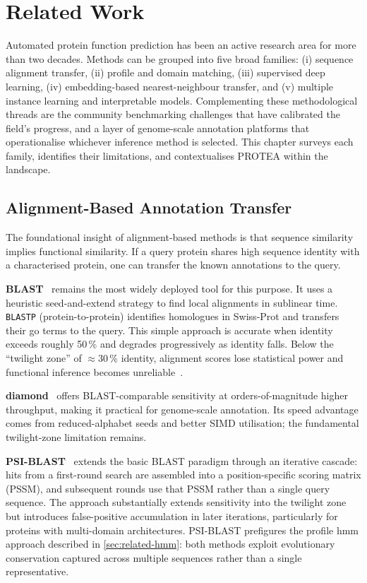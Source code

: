 \chapter{Related Work}
\label{chap:related}

Automated protein function prediction has been an active research area for more
than two decades. Methods can be grouped into five broad families: (i) sequence
alignment transfer, (ii) profile and domain matching, (iii) supervised deep
learning, (iv) embedding-based nearest-neighbour transfer, and (v) multiple
instance learning and interpretable models. Complementing these methodological
threads are the community benchmarking challenges that have calibrated the
field's progress, and a layer of genome-scale annotation platforms that
operationalise whichever inference method is selected. This chapter surveys each
family, identifies their limitations, and contextualises PROTEA within the
landscape.

\section{Alignment-Based Annotation Transfer}
\label{sec:related-alignment}

The foundational insight of alignment-based methods is that sequence similarity
implies functional similarity. If a query protein shares high sequence identity
with a characterised protein, one can transfer the known annotations to the query.

\textbf{BLAST}~\cite{altschul1990blast} remains the most widely deployed tool for
this purpose. It uses a heuristic seed-and-extend strategy to find local
alignments in sublinear time. \texttt{BLASTP} (protein-to-protein) identifies
homologues in Swiss-Prot and transfers their \gls{go} terms to the query. This simple
approach is accurate when identity exceeds roughly 50\,\% and degrades
progressively as identity falls. Below the ``twilight zone'' of $\approx$30\,\%
identity, alignment scores lose statistical power and functional inference becomes
unreliable~\cite{rost1999twilight}.

\textbf{\gls{diamond}}~\cite{buchfels2021diamond} offers BLAST-comparable sensitivity
at orders-of-magnitude higher throughput, making it practical for genome-scale
annotation. Its speed advantage comes from reduced-alphabet seeds and better
SIMD utilisation; the fundamental twilight-zone limitation remains.

\textbf{PSI-BLAST}~\cite{altschul1997psiblast} extends the basic BLAST paradigm
through an iterative cascade: hits from a first-round search are assembled into
a position-specific scoring matrix (PSSM), and subsequent rounds use that PSSM
rather than a single query sequence. The approach substantially extends
sensitivity into the twilight zone but introduces false-positive accumulation in
later iterations, particularly for proteins with multi-domain architectures.
PSI-BLAST prefigures the profile \gls{hmm} approach described in
\cref{sec:related-hmm}: both methods exploit evolutionary conservation captured
across multiple sequences rather than a single representative.

